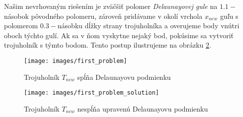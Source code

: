 Našim nevrhovaným riešením je zväčšiť polomer \textit{Delaunayovej gule} na $1.1-$násobok pôvodného polomeru,
zároveň pridávame v okolí vrchola $x_{new}$ guľu s polomerom $0.3-$násobku dĺžky strany trojuholníka a overujeme 
body vnútri oboch týchto gulí. Ak sa v ňom vyskytne nejaký bod, pokúsime sa vytvoriť trojuholník s týmto bodom.
Tento postup ilustrujeme na obrázku \ref{obr:first_problem_solution}.

\begin{figure}
    \centerline{\texttt{[image: images/first\_problem]}}
    \caption[Trojuholník $T_{new}$ spĺňa Delaunayovu podmienku]{Trojuholník $T_{new}$ spĺňa Delaunayovu podmienku}
    \label{obr:first_problem}
\end{figure}

\begin{figure}
    \centerline{\texttt{[image: images/first\_problem\_solution]}}
    \caption[Trojuholník $T_{new}$ nespĺňa upravenú Delaunayovu podmienku]{Trojuholník $T_{new}$ nespĺňa upravenú Delaunayovu podmienku}
    \label{obr:first_problem_solution}
\end{figure}



